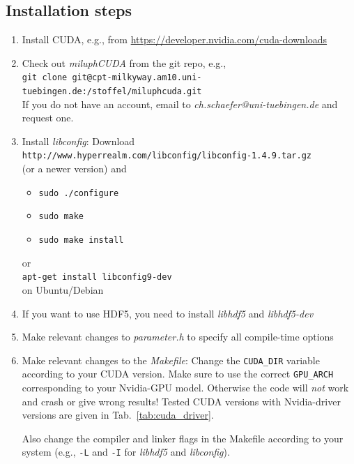 \documentclass[10pt,fleqn,twoside]{article}
\begin{document}
\subsection{Installation steps}
\begin{enumerate}
 \item Install CUDA, e.g., from \url{https://developer.nvidia.com/cuda-downloads}
 \item Check out \emph{miluphCUDA} from the git repo, e.g.,\\ \verb|git clone git@cpt-milkyway.am10.uni-tuebingen.de:/stoffel/miluphcuda.git|\\
       If you do not have an account, email to \emph{ch.schaefer@uni-tuebingen.de} and request one.
 \item Install \emph{libconfig}: Download\\
       \verb|http://www.hyperrealm.com/libconfig/libconfig-1.4.9.tar.gz|\\
       (or a newer version) and
       \begin{itemize}
        \item \verb|sudo ./configure|
        \item \verb|sudo make|
        \item \verb|sudo make install|
       \end{itemize}
       or\\
       \verb|apt-get install libconfig9-dev|\\
       on Ubuntu/Debian
 \item If you want to use HDF5, you need to install \emph{libhdf5} and \emph{libhdf5-dev}
 \item Make relevant changes to \emph{parameter.h} to specify all compile-time options
 \item Make relevant changes to the \emph{Makefile}: Change the \verb|CUDA_DIR| variable according to your CUDA version. Make sure to use the correct \verb|GPU_ARCH| corresponding to your Nvidia-GPU model. Otherwise the code will \emph{not} work and crash or give wrong results!
       Tested CUDA versions with Nvidia-driver versions are given in Tab.~\ref{tab:cuda_driver}.


       Also change the compiler and linker flags in the Makefile according to your system (e.g., \verb|-L| and \verb|-I| for \emph{libhdf5} and \emph{libconfig}).
\end{enumerate}
\end{document}
